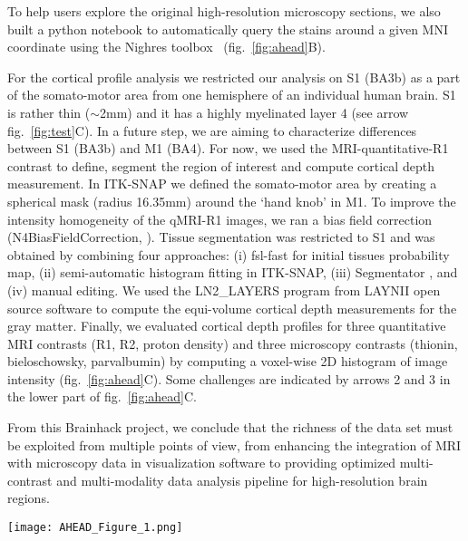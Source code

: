 \documentclass[../main.tex]{subfiles}
\begin{document}
To help users explore the original high-resolution microscopy sections, we also built a python notebook to automatically query the stains around a given MNI coordinate using the Nighres toolbox~\parencite{huntenburg_nighres_2018} (fig.~\ref{fig:ahead}B).

For the cortical profile analysis we restricted our analysis on S1 (BA3b) as a part of the somato-motor area from one hemisphere of an individual human brain. S1 is rather thin (\(\sim\)2mm) and it has a highly myelinated layer 4 (see arrow fig.~\ref{fig:test}C). In a future step, we are aiming to characterize differences between S1 (BA3b) and M1 (BA4). For now, we used the MRI-quantitative-R1 contrast to define, segment the region of interest and compute cortical depth measurement. In ITK-SNAP \parencite{Yushkevich2006} we defined the somato-motor area by creating a spherical mask (radius 16.35mm) around the ‘hand knob’ in M1. To improve the intensity homogeneity of the qMRI-R1 images, we ran a bias field correction (N4BiasFieldCorrection, \parencite{Cox1996}). Tissue segmentation was restricted to S1 and was obtained by combining four approaches: (i) fsl-fast \parencite{Smith2004} for initial tissues probability map, (ii) semi-automatic histogram fitting in ITK-SNAP, (iii) Segmentator \parencite{Gulban2018}, and (iv) manual editing. We used the LN2\_LAYERS program from LAYNII open source software \parencite{Huber2021}  to compute the equi-volume cortical depth measurements for the gray matter. Finally, we evaluated cortical depth profiles for three quantitative MRI contrasts (R1, R2, proton density) and three microscopy contrasts (thionin, bieloschowsky, parvalbumin) by computing a voxel-wise 2D histogram of image intensity (fig.~\ref{fig:ahead}C). Some challenges are indicated by arrows 2 and 3 in the lower part of fig.~\ref{fig:ahead}C.

From this Brainhack project, we conclude that the richness of the data set must be exploited from multiple points of view, from enhancing the integration of MRI with microscopy data in visualization software to providing optimized multi-contrast and multi-modality data analysis pipeline for high-resolution brain regions.

\printbibliography


\begin{figure*}
	\centering
	\texttt{[image: AHEAD\_Figure\_1.png]}
	\caption{A) Neuroglancer visualization, B) section query notebook, C) Cortical ROI and corresponding depth histograms extracted from the different contrasts available.
	}
	\label{fig:ahead}
\end{figure*}
\end{document}
